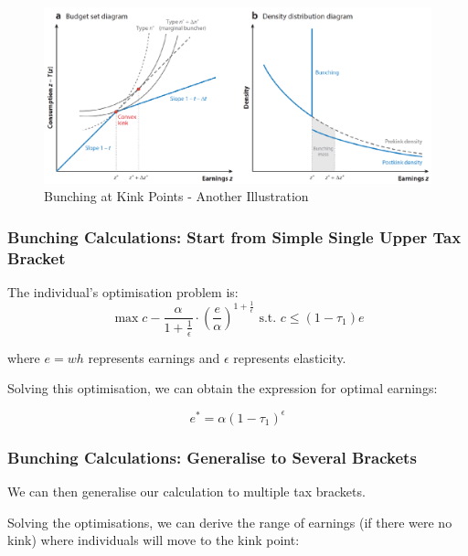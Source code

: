                 \begin{figure}[H]
                    \centering
                    \includegraphics[width=5in]{images/ch13/13_bunching_3.png}
                    \caption{Bunching at Kink Points - Another Illustration}
                \end{figure}

            \subsubsection{Bunching Calculations: Start from Simple Single Upper Tax Bracket}

                The individual's optimisation problem is:
                $$
                \max c - \frac{\alpha}{1+\frac{1}{\epsilon}} \cdot \left( \frac{e}{\alpha} \right)^{1+\frac{1}{\epsilon}} \text{ s.t. } c \leq (1-\tau_1)e
                $$

                where $e=wh$ represents earnings and $\epsilon$ represents elasticity.

                Solving this optimisation, we can obtain the expression for optimal earnings:

                \begin{equation*}
                    e^\ast = \alpha (1-\tau_1)^\epsilon
                \end{equation*}
                
            \subsubsection{Bunching Calculations: Generalise to Several Brackets}

                We can then generalise our calculation to multiple tax brackets.

                Solving the optimisations, we can derive the range of earnings (if there were no kink) where individuals will move to the kink point:

